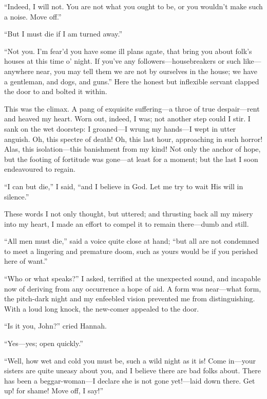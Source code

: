 \enquote{Indeed, I will not. You are not what you ought to be, or you
wouldn't make such a noise. Move off.}

\enquote{But I must die if I am turned away.}

\enquote{Not you. I'm fear'd you have some ill plans agate, that bring
you about folk's houses at this time o' night. If you've any
followers---housebreakers or such like---anywhere near, you may tell
them we are not by ourselves in the house; we have a gentleman, and
dogs, and guns.} Here the honest but inflexible servant clapped the
door to and bolted it within.

This was the climax. A pang of exquisite suffering---a throe of true
despair---rent and heaved my heart. Worn out, indeed, I was; not
another step could I stir. I sank on the wet doorstep: I groaned---I
wrung my hands---I wept in utter anguish. Oh, this spectre of death! 
Oh, this last hour, approaching in such horror! Alas, this
isolation---this banishment from my kind! Not only the anchor of hope,
but the footing of fortitude was gone---at least for a moment; but the
last I soon endeavoured to regain.

\enquote{I can but die,} I said, \enquote{and I believe in God. Let me
try to wait His will in silence.}

These words I not only thought, but uttered; and thrusting back all my
misery into my heart, I made an effort to compel it to remain
there---dumb and still.

\enquote{All men must die,} said a voice quite close at hand;
\enquote{but all are not condemned to meet a lingering and premature
doom, such as yours would be if you perished here of want.}

\enquote{Who or what speaks?} I asked, terrified at the unexpected
sound, and incapable now of deriving from any occurrence a hope of aid. 
A form was near---what form, the pitch-dark night and my enfeebled
vision prevented me from distinguishing. With a loud long knock, the
new-comer appealed to the door.

\enquote{Is it you, \Mr{} \St{} John?} cried Hannah.

\enquote{Yes---yes; open quickly.}

\enquote{Well, how wet and cold you must be, such a wild night as it
is! Come in---your sisters are quite uneasy about you, and I believe
there are bad folks about. There has been a beggar-woman---I declare
she is not gone yet!---laid down there. Get up! for shame! Move off, I
say!}


